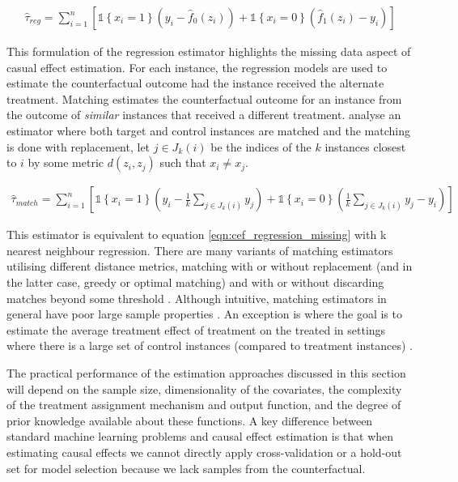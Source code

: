 \documentclass[11pt,a4paper,oneside]{book}
\newcommand{\set}[1]{\left\{#1\right\}}
\newcommand{\ind}[1]{\mathds{1}\!\!\set{#1}}
\newcommand{\eqn}[1]{\begin{align}#1\end{align}}
\theoremstyle{plain}
\theoremstyle{definition}
\begin{document}
\eqn{
\label{eqn:cef_regression_missing}
\hat{\tau}_{reg} = \sum_{i=1}^n \left[\ind{x_i=1}\left(y_i - \hat{f}_0(z_i)\right) +\ind{x_i=0}\left(\hat{f}_1(z_i) - y_i \right)\right]
}

This formulation of the regression estimator highlights the missing data aspect of casual effect estimation. For each instance, the regression models are used to estimate the counterfactual outcome had the instance received the alternate treatment. Matching estimates the counterfactual outcome for an instance from the outcome of \emph{similar} instances that received a different treatment. \citet{abadie2002simple} analyse an estimator where both target and control instances are matched and the matching is done with replacement, let $j \in J_k(i)$ be the indices of the $k$ instances closest to $i$ by some metric $d(z_i,z_j)$ such that $x_i \neq x_j$.

\eqn{
\hat{\tau}_{match} = \sum_{i=1}^n \left[\ind{x_i=1}\left(y_i - \frac{1}{k}\sum_{j \in J_k(i)}y_j\right) +\ind{x_i=0}\left(\frac{1}{k}\sum_{j \in J_k(i)}y_j - y_i \right)\right]
}

This estimator is equivalent to equation \ref{eqn:cef_regression_missing} with k nearest neighbour regression. There are many variants of matching estimators utilising different distance metrics, matching with or without replacement (and in the latter case, greedy or optimal matching) and with or without discarding matches beyond some threshold \citep{Cochran1973,rosenbaum1985constructing}. Although intuitive, matching estimators in general have poor large sample properties \citep{Abadie2006}. An exception is where the goal is to estimate the average treatment effect of treatment on the treated in settings where there is a large set of control instances (compared to treatment instances) \citep{Imbens2004}. 

The practical performance of the estimation approaches discussed in this section will depend on the sample size, dimensionality of the covariates, the complexity of the treatment assignment mechanism and output function, and the degree of prior knowledge available about these functions. A key difference between standard machine learning problems and causal effect estimation is that when estimating causal effects we cannot directly apply cross-validation or a hold-out set for model selection because we lack samples from the counterfactual. 
\end{document}
